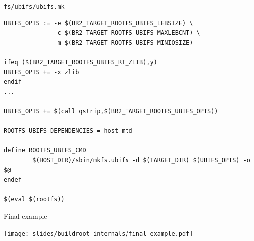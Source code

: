 \begin{frame}[fragile]{{\tt fs/ubifs/ubifs.mk}}
  \begin{block}{}
    \begin{verbatim}
UBIFS_OPTS := -e $(BR2_TARGET_ROOTFS_UBIFS_LEBSIZE) \
              -c $(BR2_TARGET_ROOTFS_UBIFS_MAXLEBCNT) \
              -m $(BR2_TARGET_ROOTFS_UBIFS_MINIOSIZE)

ifeq ($(BR2_TARGET_ROOTFS_UBIFS_RT_ZLIB),y)
UBIFS_OPTS += -x zlib
endif
...

UBIFS_OPTS += $(call qstrip,$(BR2_TARGET_ROOTFS_UBIFS_OPTS))

ROOTFS_UBIFS_DEPENDENCIES = host-mtd

define ROOTFS_UBIFS_CMD
        $(HOST_DIR)/sbin/mkfs.ubifs -d $(TARGET_DIR) $(UBIFS_OPTS) -o $@
endef

$(eval $(rootfs))
    \end{verbatim}
  \end{block}
\end{frame}

\begin{frame}{Final example}
  \begin{center}
    \texttt{[image: slides/buildroot-internals/final-example.pdf]}
  \end{center}
\end{frame}
